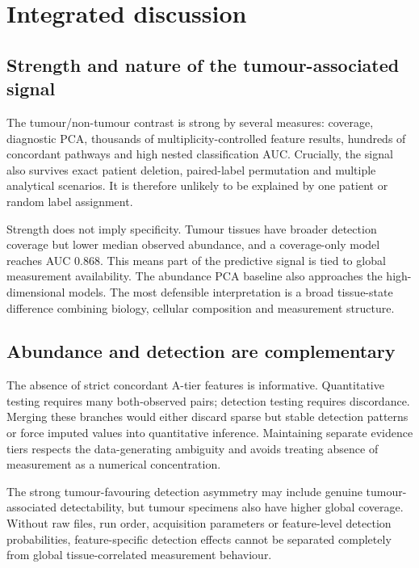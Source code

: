 \chapter{Integrated discussion}
\label{chap:integrated_discussion}

\section{Strength and nature of the tumour-associated signal}
\label{sec:strength_and_nature_of_the_tumour_associated_signal}

The tumour/non-tumour contrast is strong by several measures: coverage, diagnostic PCA, thousands of multiplicity-controlled feature results, hundreds of concordant pathways and high nested classification AUC. Crucially, the signal also survives exact patient deletion, paired-label permutation and multiple analytical scenarios. It is therefore unlikely to be explained by one patient or random label assignment.

Strength does not imply specificity. Tumour tissues have broader detection coverage but lower median observed abundance, and a coverage-only model reaches AUC 0.868. This means part of the predictive signal is tied to global measurement availability. The abundance PCA baseline also approaches the high-dimensional models. The most defensible interpretation is a broad tissue-state difference combining biology, cellular composition and measurement structure.

\section{Abundance and detection are complementary}
\label{sec:abundance_and_detection_are_complementary}

The absence of strict concordant A-tier features is informative. Quantitative testing requires many both-observed pairs; detection testing requires discordance. Merging these branches would either discard sparse but stable detection patterns or force imputed values into quantitative inference. Maintaining separate evidence tiers respects the data-generating ambiguity and avoids treating absence of measurement as a numerical concentration.

The strong tumour-favouring detection asymmetry may include genuine tumour-associated detectability, but tumour specimens also have higher global coverage. Without raw files, run order, acquisition parameters or feature-level detection probabilities, feature-specific detection effects cannot be separated completely from global tissue-correlated measurement behaviour.

